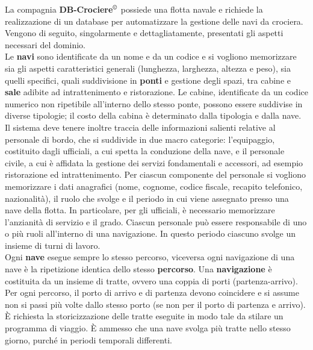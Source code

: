 \documentclass[a4paper, titlepage]{report}
\begin{document}
	\begin{linenumbers}
	\noindent
	La compagnia \textbf{DB-Crociere}$^{\copyright}$ possiede una flotta navale e richiede la realizzazione di un database per automatizzare la gestione delle navi da crociera. Vengono di seguito, singolarmente e dettagliatamente, presentati gli aspetti necessari del dominio. \\
	
	\noindent
	Le \textbf{navi} sono identificate da un nome e da un codice e si vogliono memorizzare sia gli aspetti caratteristici generali (lunghezza, larghezza, altezza e peso), sia quelli specifici, quali suddivisione in \textbf{ponti} e gestione degli spazi, tra cabine e \textbf{sale} adibite ad  intrattenimento e ristorazione. Le cabine, identificate da un codice numerico non ripetibile all'interno dello stesso ponte, possono essere suddivise in diverse tipologie; il costo della cabina è determinato dalla tipologia e dalla nave. \\
	
	\noindent
	Il sistema deve tenere inoltre traccia delle informazioni salienti relative al personale di bordo, che si suddivide in due macro categorie: l'equipaggio, costituito dagli ufficiali, a cui spetta la conduzione della nave, e il personale civile, a cui è affidata la gestione dei servizi fondamentali e accessori, ad esempio ristorazione ed intrattenimento. Per ciascun componente del personale si vogliono memorizzare i dati anagrafici (nome, cognome, codice fiscale, recapito telefonico, nazionalità), il ruolo che svolge e il periodo in cui viene assegnato presso una nave della flotta. In particolare, per gli ufficiali, è necessario memorizzare l'anzianità di servizio e il grado. Ciascun personale può essere responsabile di uno o più ruoli all'interno di una navigazione. In questo periodo ciascuno svolge un insieme di turni di lavoro.  \\

	\noindent	
	Ogni \textbf{nave} esegue sempre lo stesso percorso, viceversa ogni navigazione di una nave è la ripetizione identica dello stesso \textbf{percorso}. Una \textbf{navigazione} è costituita da un insieme di tratte, ovvero una coppia di porti (partenza-arrivo). Per ogni percorso, il porto di arrivo e di partenza devono coincidere e si assume non si passi più volte dallo stesso porto (se non per il porto di partenza e arrivo). È richiesta la storicizzazione delle tratte eseguite in modo tale da stilare un programma di viaggio. È ammesso che una nave svolga più tratte nello stesso giorno, purché in periodi temporali differenti. \\
	

\end{linenumbers}
\end{document}
